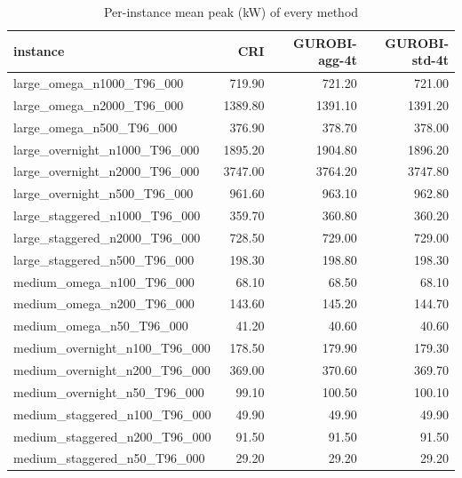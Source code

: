 \begin{table}[htbp]
\centering
\small
\caption{Per-instance mean peak (kW) of every method}
\label{tab:E7_gurobi_threads_b60_per_instance}
\begin{tabular}{lrrr}
\toprule
instance & CRI & GUROBI-agg-4t & GUROBI-std-4t \\
\midrule
large\_omega\_n1000\_T96\_000 & 719.90 & 721.20 & 721.00 \\
large\_omega\_n2000\_T96\_000 & 1389.80 & 1391.10 & 1391.20 \\
large\_omega\_n500\_T96\_000 & 376.90 & 378.70 & 378.00 \\
large\_overnight\_n1000\_T96\_000 & 1895.20 & 1904.80 & 1896.20 \\
large\_overnight\_n2000\_T96\_000 & 3747.00 & 3764.20 & 3747.80 \\
large\_overnight\_n500\_T96\_000 & 961.60 & 963.10 & 962.80 \\
large\_staggered\_n1000\_T96\_000 & 359.70 & 360.80 & 360.20 \\
large\_staggered\_n2000\_T96\_000 & 728.50 & 729.00 & 729.00 \\
large\_staggered\_n500\_T96\_000 & 198.30 & 198.80 & 198.30 \\
medium\_omega\_n100\_T96\_000 & 68.10 & 68.50 & 68.10 \\
medium\_omega\_n200\_T96\_000 & 143.60 & 145.20 & 144.70 \\
medium\_omega\_n50\_T96\_000 & 41.20 & 40.60 & 40.60 \\
medium\_overnight\_n100\_T96\_000 & 178.50 & 179.90 & 179.30 \\
medium\_overnight\_n200\_T96\_000 & 369.00 & 370.60 & 369.70 \\
medium\_overnight\_n50\_T96\_000 & 99.10 & 100.50 & 100.10 \\
medium\_staggered\_n100\_T96\_000 & 49.90 & 49.90 & 49.90 \\
medium\_staggered\_n200\_T96\_000 & 91.50 & 91.50 & 91.50 \\
medium\_staggered\_n50\_T96\_000 & 29.20 & 29.20 & 29.20 \\
\bottomrule
\end{tabular}
\end{table}
